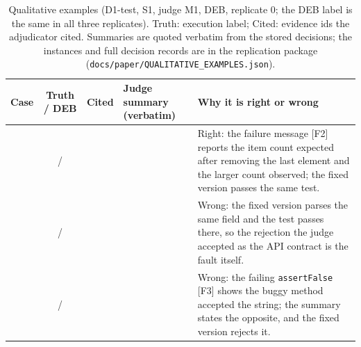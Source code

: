 \documentclass[pdflatex,iicol,sn-mathphys-num]{sn-jnl}
\begin{document}
\begin{appendices}
{\renewcommand{\thetable}{B1}\renewcommand{\theHtable}{B1.qual}
\begin{table}[t]
\caption{Qualitative examples (D1-test, S1, judge M1, DEB, replicate 0; the DEB label is the same in all three replicates). Truth: execution label; Cited: evidence ids the adjudicator cited. Summaries are quoted verbatim from the stored decisions; the instances and full decision records are in the replication package (\texttt{docs/paper/QUALITATIVE\_EXAMPLES.json}).}\label{tab:qual}
\scriptsize\setlength{\tabcolsep}{3pt}
\begin{tabularx}{\textwidth}{@{}>{\raggedright\arraybackslash}p{3.2cm} c >{\raggedright\arraybackslash}p{1.3cm} Y >{\raggedright\arraybackslash}p{3.9cm}@{}}
\toprule
Case & Truth / DEB & Cited & Judge summary (verbatim) & Why it is right or wrong \\
\midrule
\textbf{\QcaseA{}} \QbugA{}\newline \QidA{} & \QtruthA{} / \QdebA{} & \QevA{} & \QsumA{} & Right: the failure message [F2] reports the item count expected after removing the last element and the larger count observed; the fixed version passes the same test. \\
\textbf{\QcaseB{}} \QbugB{}\newline \QidB{} & \QtruthB{} / \QdebB{} & \QevB{} & \QsumB{} & Wrong: the fixed version parses the same field and the test passes there, so the rejection the judge accepted as the API contract is the fault itself. \\
\textbf{\QcaseC{}} \QbugC{}\newline \QidC{} & \QtruthC{} / \QdebC{} & \QevC{} & \QsumC{} & Wrong: the failing \texttt{assertFalse} [F3] shows the buggy method accepted the string; the summary states the opposite, and the fixed version rejects it. \\
\bottomrule
\end{tabularx}
\end{table}
}

\end{appendices}
\end{document}
